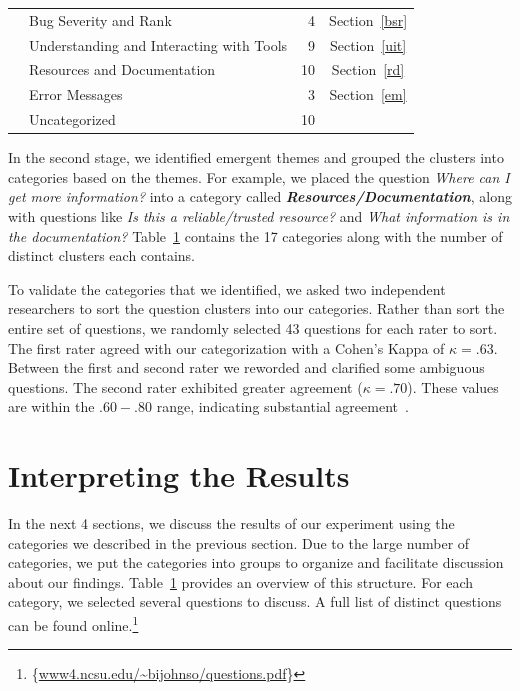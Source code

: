 \documentclass[conference]{IEEEtran}
\newcommand{\blind}[1]{{\color{white}\{#1\}}}
\begin{document}
\begin{table}
\begin{tabular}{|l|l|r|c|}
    									& Bug Severity and Rank											& 4     		& Section~\ref{bsr}		\\

    									& Understanding and Interacting with Tools						& 9     		& Section~\ref{uit}			\\

   	 									& Resources and Documentation									& 10     		& Section~\ref{rd}		\\

    									& Error Messages												& 3     		& Section~\ref{em}		\\
    \hline	
       									& Uncategorized													& 10    		&			 \\
    \hline
\end{tabular}
\label{table:categories}
\end{table}


In the second stage, we identified emergent themes and grouped the clusters into categories based on the themes. 
For example, we placed the question \textit{Where can I get more information?} into a category called \emph{\textbf{Resources/Documentation}}, along with questions like \textit{Is this a reliable/trusted resource?} and \textit{What information is in the documentation?} 
Table~\ref{table:categories} contains the 17 categories along with the number of distinct clusters each contains. 

To validate the categories that we identified, we asked two independent researchers to sort the question clusters into our categories. 
Rather than sort the entire set of questions, we randomly selected 43 questions for each rater to sort.
The first rater agreed with our categorization with a Cohen's Kappa of $\kappa = .63$. 
Between the first and second rater we reworded and clarified some ambiguous questions. The second rater exhibited greater agreement ($\kappa = .70$). 
These values are within the $.60 - .80$ range, indicating substantial agreement~\cite{Landis1977agreement}.

\section{Interpreting the Results}
\label{sec:results}

In the next 4 sections, we discuss the results of our experiment using the categories we described in the previous section.
Due to the large number of categories, we put the categories into groups to organize and facilitate discussion about our findings. Table~\ref{table:categories} provides an overview of this structure.
For each category, we selected several questions to discuss. A full list of distinct questions can be found online.\footnote{\blind{\url{www4.ncsu.edu/~bijohnso/questions.pdf}}}
\end{document}
